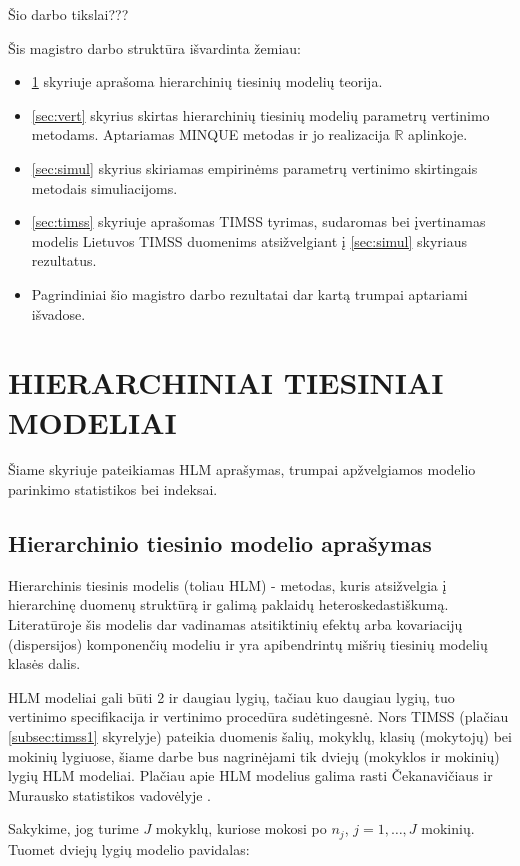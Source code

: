 \documentclass[12pt,a4paper]{article}
\newcommand{\R}{{\mathbb R}}
\begin{document}
\indent Šio darbo tikslai???

\indent Šis magistro darbo struktūra išvardinta žemiau:
\begin{itemize}
\item \ref{sec:hlm} skyriuje aprašoma hierarchinių tiesinių modelių teorija.
\item \ref{sec:vert} skyrius skirtas hierarchinių tiesinių modelių parametrų vertinimo metodams. Aptariamas MINQUE metodas ir jo realizacija $\R$ aplinkoje.
\item \ref{sec:simul} skyrius skiriamas empirinėms parametrų vertinimo skirtingais metodais simuliacijoms.
\item \ref{sec:timss} skyriuje aprašomas TIMSS tyrimas, sudaromas bei įvertinamas modelis Lietuvos TIMSS duomenims atsižvelgiant į \ref{sec:simul} skyriaus rezultatus.
\item Pagrindiniai šio magistro darbo rezultatai dar kartą trumpai aptariami išvadose.
\end{itemize}

\newpage
\section{HIERARCHINIAI TIESINIAI MODELIAI} \label{sec:hlm}
\indent Šiame skyriuje pateikiamas HLM aprašymas, trumpai apžvelgiamos modelio parinkimo statistikos bei indeksai.

\subsection{Hierarchinio tiesinio modelio aprašymas}
\indent Hierarchinis tiesinis modelis (toliau HLM) - metodas, kuris atsižvelgia į hierarchinę duomenų struktūrą ir galimą paklaidų heteroskedastiškumą. Literatūroje šis modelis dar vadinamas atsitiktinių efektų arba kovariacijų (dispersijos) komponenčių modeliu ir yra apibendrintų mišrių tiesinių modelių klasės dalis\cite{hlmmixed}.

\indent HLM modeliai gali būti 2 ir daugiau lygių, tačiau kuo daugiau lygių, tuo vertinimo specifikacija ir vertinimo procedūra sudėtingesnė. Nors TIMSS (plačiau \ref{subsec:timss1} skyrelyje) pateikia duomenis šalių, mokyklų, klasių (mokytojų) bei mokinių lygiuose, šiame darbe bus nagrinėjami tik dviejų (mokyklos ir mokinių) lygių HLM modeliai. Plačiau apie HLM modelius galima rasti Čekanavičiaus ir Murausko statistikos vadovėlyje \cite{cek}.

\indent Sakykime, jog turime $J$ mokyklų, kuriose mokosi po $n_j$, $j = 1,\dots,J$ mokinių. Tuomet dviejų lygių modelio pavidalas:
\end{document}

